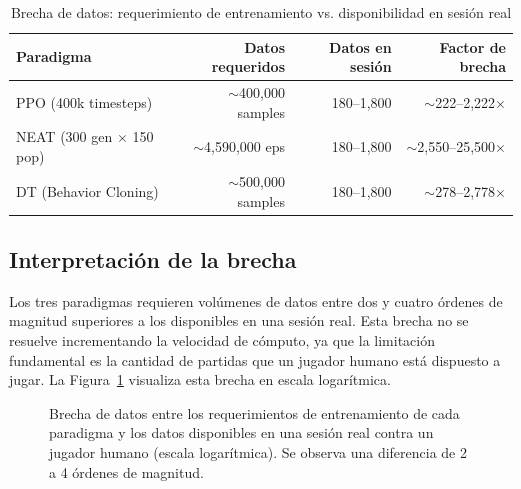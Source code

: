 \begin{table}[H]
\centering
\caption{Brecha de datos: requerimiento de entrenamiento vs. disponibilidad en sesión real}
\begin{tabular}{lrrr}
\hline
\textbf{Paradigma} & \textbf{Datos requeridos} & \textbf{Datos en sesión} & \textbf{Factor de brecha} \\
\hline
PPO (400k timesteps)     & $\sim$400,000 samples   & 180--1,800 & $\sim$222--2,222$\times$ \\
NEAT (300 gen $\times$ 150 pop) & $\sim$4,590,000 eps & 180--1,800 & $\sim$2,550--25,500$\times$ \\
DT (Behavior Cloning)    & $\sim$500,000 samples   & 180--1,800 & $\sim$278--2,778$\times$ \\
\hline
\end{tabular}
\label{tab:data_gap}
\end{table}

\subsection{Interpretación de la brecha}

Los tres paradigmas requieren volúmenes de datos entre dos y cuatro órdenes de magnitud superiores a los disponibles en una sesión real. Esta brecha no se resuelve incrementando la velocidad de cómputo, ya que la limitación fundamental es la cantidad de partidas que un jugador humano está dispuesto a jugar. La Figura~\ref{fig:brecha_datos} visualiza esta brecha en escala logarítmica.

\begin{figure}[H]
\centering
{}
\caption[Brecha de datos: entrenamiento vs.\ sesión real]{Brecha de datos entre los requerimientos de entrenamiento de cada paradigma y los datos disponibles en una sesi\'{o}n real contra un jugador humano (escala logar\'{i}tmica). Se observa una diferencia de 2 a 4 \'{o}rdenes de magnitud.}
\label{fig:brecha_datos}
\end{figure}

